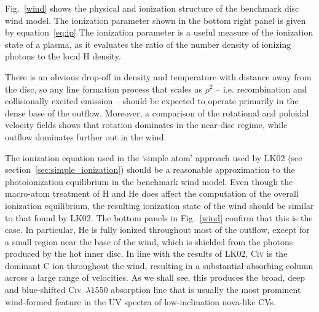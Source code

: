 Fig.~\ref{wind} shows the physical and ionization structure 
of the benchmark disc wind model. The ionization parameter shown in the bottom
right panel is given by equation~\ref{eq:ip}
 The ionization parameter is a useful measure of the ionization state of a plasma, 
as it evaluates the ratio of the number density of ionizing photons to the local 
H density.

There is an obvious drop-off in density
and temperature with distance away from the disc, so any line
formation process that scales as $\rho^2$ -- i.e. recombination and
collisionally excited emission -- should be expected to operate
primarily in the dense base of the outflow. Moreover, a comparison of
the rotational and poloidal velocity fields shows that rotation
dominates in the near-disc regime, while outflow dominates further out
in the wind. 

The ionization equation used in the `simple atom' approach used by
LK02 (see section~\ref{sec:simple_ionization}) should be a reasonable approximation to
the photoionization equilibrium in the benchmark wind model. Even
though the macro-atom treatment of H and He does affect the 
computation of the overall ionization equilibrium, the
resulting ionization state of the wind should be similar to that
found by LK02. The bottom panels in Fig.~\ref{wind} confirm that this
is the case. In particular, He is fully ionized
throughout most of the outflow, except for a small region near the
base of the wind, which is shielded from the photons produced by the
hot inner disc. In line with the results of LK02,
C\textsc{iv} is the dominant C ion throughout the wind,
resulting in a substantial absorbing column across a large range of
velocities. As we shall see, this produces the broad, deep and
blue-shifted C\textsc{iv}~$\lambda1550$ absorption line that
is usually the most prominent wind-formed feature in the UV spectra of
low-inclination nova-like CVs.

